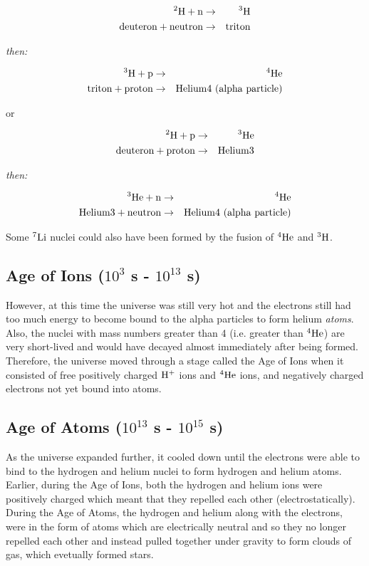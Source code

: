 \begin{eqnarray*}
 ^{2}\rm{H} + n & \rightarrow & ^{3}\rm{H} \\
\rm{deuteron} + \rm{neutron} & \rightarrow & \rm{triton} 
\end{eqnarray*}

\centerline{\emph{then:}} 

\begin{eqnarray*}
 ^{3}\rm{H} + p & \rightarrow & ^{4}\rm{He} \\
\rm{triton} + \rm{proton} & \rightarrow & \rm{Helium}\rm{4} \ \rm{(alpha} \ \rm{particle)}  
\end{eqnarray*}

or

\begin{eqnarray*}
 ^{2}\rm{H} + p & \rightarrow & ^{3}\rm{He} \\
\rm{deuteron} + \rm{proton} & \rightarrow & \rm{Helium}\rm{3} 
\end{eqnarray*}

\centerline{\emph{then:}} 

\begin{eqnarray*}
 ^{3}\rm{He} + n & \rightarrow & ^{4}\rm{He} \\
\rm{Helium3} + \rm{neutron} & \rightarrow & \rm{Helium}\rm{4} \ \rm{(alpha} \ \rm{particle)}  
\end{eqnarray*}

Some $^{7}\rm{Li}$ nuclei could also have been formed by the fusion of $^{4}\rm{He}$ and $^{3}\rm{H}$.

\subsection{Age of Ions ($10^{3}$ s - $10^{13}$ s)}
However, at this time the universe was still very hot and the electrons still had too much energy to become bound to the alpha particles to form helium \emph{atoms}. Also, the nuclei with mass numbers greater than 4 (i.e. greater than $^{4}\rm{He}$) are very short-lived and would have decayed almost immediately after being formed. Therefore, the universe moved through a stage called the Age of Ions when it consisted of free positively charged $\rm{H}^{+}$ ions and $^{4}\rm{He}$ ions, and negatively charged electrons not yet bound into atoms.

\subsection{Age of Atoms ($10^{13}$ s - $10^{15}$ s)}
As the universe expanded further, it cooled down until the electrons were able to bind to the hydrogen and helium nuclei to form hydrogen and helium atoms. Earlier, during the Age of Ions, both the hydrogen and helium ions were positively charged which meant that they repelled each other (electrostatically). During the Age of Atoms, the hydrogen and helium along with the electrons, were in the form of atoms which are electrically neutral and so they no longer repelled each other and instead pulled together under gravity to form clouds of gas, which evetually formed stars.

